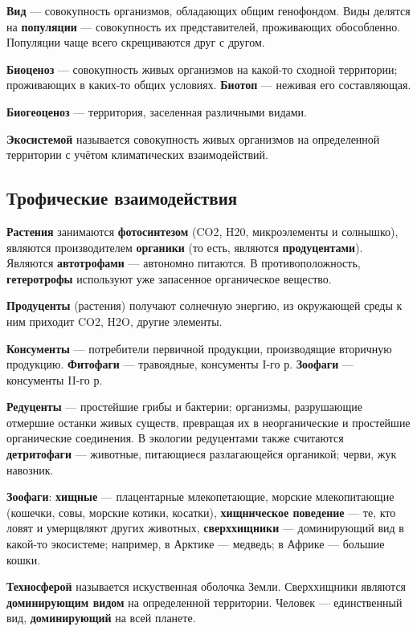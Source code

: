 \documentclass{article}
\begin{document}
\textbf{Вид} — совокупность организмов, обладающих общим генофондом. Виды делятся на \textbf{популяции} — совокупность их представителей, проживающих обособленно. Популяции чаще всего скрещиваются друг с другом.

\textbf{Биоценоз} — совокупность живых организмов на какой-то сходной территории; проживающих в каких-то общих условиях. \textbf{Биотоп} — неживая его составляющая.

\textbf{Биогеоценоз} — территория, заселенная различными видами.

\textbf{Экосистемой} называется совокупность живых организмов на определенной территории с учётом климатических взаимодействий.

\subsection{Трофические взаимодействия}

\textbf{Растения} занимаются \textbf{фотосинтезом} (CO2, H20, микроэлементы и солнышко), являются производителем \textbf{органики} (то есть, являются \textbf{продуцентами}). Являются \textbf{автотрофами} — автономно питаются. В противоположность, \textbf{гетеротрофы} используют уже запасенное органическое вещество.

\textbf{Продуценты} (растения) получают солнечную энергию, из окружающей среды к ним приходит CO2, H2O, другие элементы.

\textbf{Консументы} — потребители первичной продукции, производящие вторичную продукцию. \textbf{Фитофаги} — травоядные, консументы I-го р. \textbf{Зоофаги} — консументы II-го р.

\textbf{Редуценты} — простейшие грибы и бактерии; организмы, разрушающие отмершие останки живых существ, превращая их в неорганические и простейшие органические соединения. В экологии редуцентами также считаются \textbf{детритофаги} — животные, питающиеся разлагающейся органикой; черви, жук навозник.
 
\textbf{Зоофаги}: \textbf{хищные} — плацентарные млекопетающие, морские млекопитающие (кошечки, совы, морские котики, косатки), \textbf{хищническое поведение} — те, кто ловят и умерщвляют других животных, \textbf{сверххищники} — доминирующий вид в какой-то экосистеме; например, в Арктике — медведь; в Африке — большие кошки.

\textbf{Техносферой} называется искуственная оболочка Земли. Сверххищники являются \textbf{доминирующим видом} на определенной территории. Человек — единственный вид, \textbf{доминирующий} на всей планете. 
\end{document}
